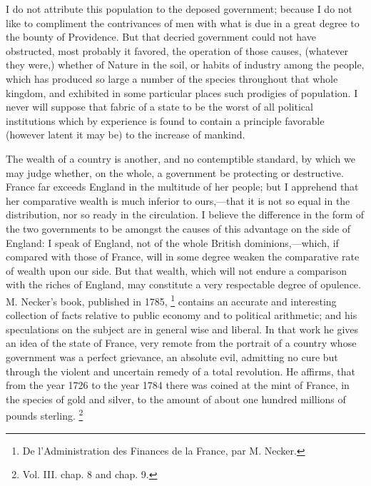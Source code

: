 I do not attribute this population to the deposed government; because I do not like to compliment the contrivances of men with what is due in a great degree to the bounty of Providence. But that decried government could not have obstructed, most probably it favored, the operation of those causes, (whatever they were,) whether of Nature in the soil, or habits of industry among the people, which has produced so large a number of the species throughout that whole kingdom, and exhibited in some particular places such prodigies of population. I never will suppose that fabric of a state to be the worst of all political institutions which by experience is found to contain a principle favorable (however latent it may be) to the increase of mankind.

The wealth of a country is another, and no contemptible standard, by which we may judge whether, on the whole, a government be protecting or destructive. France far exceeds England in the multitude of her people; but I apprehend that her comparative wealth is much inferior to ours,—that it is not so equal in the distribution, nor so ready in the circulation. I believe the difference in the form of the two governments to be amongst the causes of this advantage on the side of England: I speak of England, not of the whole British dominions,—which, if compared with those of France, will in some degree weaken the comparative rate of wealth upon our side. But that wealth, which will not endure a comparison with the riches of England, may constitute a very respectable degree of opulence. M. Necker's book, published in 1785,
\footnote{ De l'Administration des Finances de la France, par M. Necker.}
 contains an accurate and interesting collection of facts relative to public economy and to political arithmetic; and his speculations on the subject are in general wise and liberal. In that work he gives an idea of the state of France, very remote from the portrait of a country whose government was a perfect grievance, an absolute evil, admitting no cure but through the violent and uncertain remedy of a total revolution. He affirms, that from the year 1726 to the year 1784 there was coined at the mint of France, in the species of gold and silver, to the amount of about one hundred millions of pounds sterling.
\footnote{ Vol. III. chap. 8 and chap. 9.}


